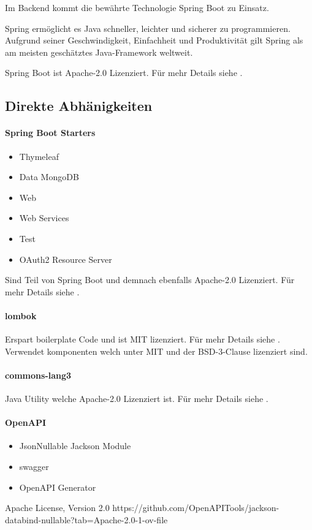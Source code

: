 Im Backend kommt die bewährte Technologie Spring Boot zu Einsatz.

Spring ermöglicht es Java schneller, leichter und sicherer zu programmieren.
Aufgrund seiner Geschwindigkeit, Einfachheit und Produktivität gilt Spring als am meisten geschätztes Java-Framework weltweit.
\cite{about-springboot}

Spring Boot ist Apache-2.0 Lizenziert.
Für mehr Details siehe .

\subsection{Direkte Abhänigkeiten}

\paragraph{Spring Boot Starters}
\begin{itemize}
    \item Thymeleaf
    \item Data MongoDB
    \item Web
    \item Web Services
    \item Test
    \item OAuth2 Resource Server
\end{itemize}
Sind Teil von Spring Boot und demnach ebenfalls Apache-2.0 Lizenziert.
Für mehr Details siehe .

\paragraph{lombok}
Erspart boilerplate Code und ist MIT lizenziert.
Für mehr Details siehe .\\
Verwendet komponenten welch unter MIT und der BSD-3-Clause lizenziert sind.

\paragraph{commons-lang3}
Java Utility welche Apache-2.0 Lizenziert ist.
Für mehr Details siehe .

\paragraph{OpenAPI}
\begin{itemize}
    \item JsonNullable Jackson Module
    \item swagger
    \item OpenAPI Generator
\end{itemize}
Apache License, Version 2.0
https://github.com/OpenAPITools/jackson-databind-nullable?tab=Apache-2.0-1-ov-file

